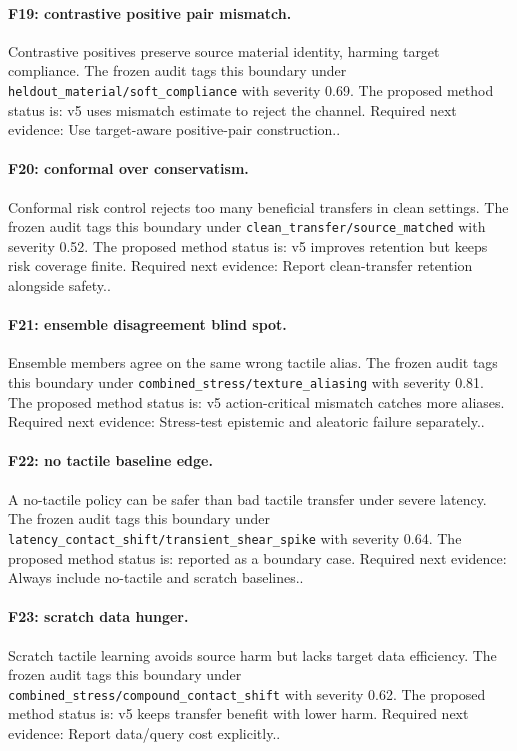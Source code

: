 \documentclass{article}
\begin{document}
\paragraph{F19: contrastive positive pair mismatch.} Contrastive positives preserve source material identity, harming target compliance. The frozen audit tags this boundary under \texttt{heldout\_material/soft\_compliance} with severity 0.69. The proposed method status is: v5 uses mismatch estimate to reject the channel. Required next evidence: Use target-aware positive-pair construction..

\paragraph{F20: conformal over conservatism.} Conformal risk control rejects too many beneficial transfers in clean settings. The frozen audit tags this boundary under \texttt{clean\_transfer/source\_matched} with severity 0.52. The proposed method status is: v5 improves retention but keeps risk coverage finite. Required next evidence: Report clean-transfer retention alongside safety..

\paragraph{F21: ensemble disagreement blind spot.} Ensemble members agree on the same wrong tactile alias. The frozen audit tags this boundary under \texttt{combined\_stress/texture\_aliasing} with severity 0.81. The proposed method status is: v5 action-critical mismatch catches more aliases. Required next evidence: Stress-test epistemic and aleatoric failure separately..

\paragraph{F22: no tactile baseline edge.} A no-tactile policy can be safer than bad tactile transfer under severe latency. The frozen audit tags this boundary under \texttt{latency\_contact\_shift/transient\_shear\_spike} with severity 0.64. The proposed method status is: reported as a boundary case. Required next evidence: Always include no-tactile and scratch baselines..

\paragraph{F23: scratch data hunger.} Scratch tactile learning avoids source harm but lacks target data efficiency. The frozen audit tags this boundary under \texttt{combined\_stress/compound\_contact\_shift} with severity 0.62. The proposed method status is: v5 keeps transfer benefit with lower harm. Required next evidence: Report data/query cost explicitly..
\end{document}
